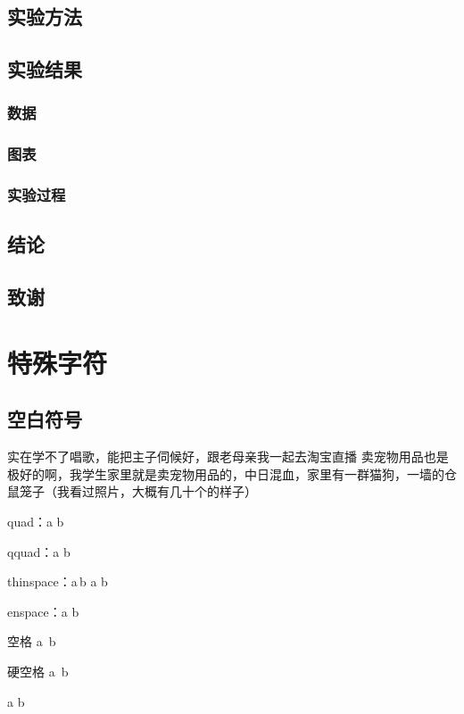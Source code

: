 \documentclass{article} %
\begin{document}
	\subsection{实验方法}
	\subsection{实验结果}
	\subsubsection{数据}
	\subsubsection{图表}
	\subsubsection{实验过程}
	\subsection{结论}
	\subsection{致谢}	
	
	
	
	
	
	\section{特殊字符}
	
	\subsection{空白符号}
	实在学不了唱歌，能把主子伺候好，跟老母亲我一起去淘宝直播 卖宠物用品也是极好的啊，我学生家里就是卖宠物用品的，中日混血，家里有一群猫狗，一墙的仓鼠笼子（我看过照片，大概有几十个的样子）
	

	quad：a \quad b 
	
	qquad：a \qquad b 
	
	thinspace：a\,b a \thinspace b 
	
	
	enspace：a \enspace b 
	
	空格 a\ b 
	
	硬空格 a~b
	
	a \kern 1pc b
	
\end{document}
